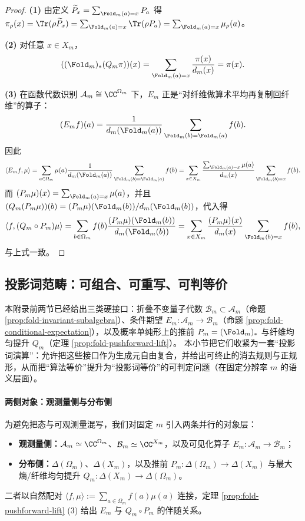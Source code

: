 \begin{proof}
\textbf{(1)} 由定义 \(\widetilde P_x=\sum_{\Fold_m(a)=x}P_a\) 得
\(
\pi_\rho(x)=\Tr(\rho\widetilde P_x)=\sum_{\Fold_m(a)=x}\Tr(\rho P_a)=\sum_{\Fold_m(a)=x}\mu_\rho(a)
\)。

\textbf{(2)} 对任意 $x\in X_m$，
\[
((\Fold_m)_*(Q_m\pi))(x)=\sum_{\Fold_m(a)=x}\frac{\pi(x)}{d_m(x)}=\pi(x).
\]

\textbf{(3)} 在函数代数识别 $\mathcal{A}_m\cong \CC^{\Omega_m}$ 下，$E_m$ 正是“对纤维做算术平均再复制回纤维”的算子：
\[
(E_m f)(a)=\frac{1}{d_m(\Fold_m(a))}\sum_{\Fold_m(b)=\Fold_m(a)} f(b).
\]
因此
\[
\langle E_m f,\mu\rangle
=\sum_{a\in\Omega_m}\mu(a)\frac{1}{d_m(\Fold_m(a))}\sum_{\Fold_m(b)=\Fold_m(a)} f(b)
=\sum_{x\in X_m}\frac{\sum_{\Fold_m(a)=x}\mu(a)}{d_m(x)}\sum_{\Fold_m(b)=x}f(b).
\]
而 $(P_m\mu)(x)=\sum_{\Fold_m(a)=x}\mu(a)$，并且 $(Q_m(P_m\mu))(b)=(P_m\mu)(\Fold_m(b))/d_m(\Fold_m(b))$，代入得
\[
\langle f,(Q_m\circ P_m)\mu\rangle
=\sum_{b\in\Omega_m} f(b)\frac{(P_m\mu)(\Fold_m(b))}{d_m(\Fold_m(b))}
=\sum_{x\in X_m}\frac{(P_m\mu)(x)}{d_m(x)}\sum_{\Fold_m(b)=x}f(b),
\]
与上式一致。
\end{proof}

\subsection{投影词范畴：可组合、可重写、可判等价}\label{app:op-algebra-projection-word}
本附录前两节已经给出三类硬接口：折叠不变量子代数 \(\mathcal{B}_m\subset\mathcal{A}_m\)（命题 \ref{prop:fold-invariant-subalgebra}）、条件期望 \(E_m:\mathcal{A}_m\to\mathcal{B}_m\)（命题 \ref{prop:fold-conditional-expectation}），以及概率单纯形上的推前 \(P_m=(\Fold_m)_*\) 与纤维均匀提升 \(Q_m\)（定理 \ref{prop:fold-pushforward-lift}）。
本小节把它们收紧为一套“投影词演算”：允许把这些接口作为生成元自由复合，并给出可终止的消去规则与正规形，从而把“算法等价”提升为“投影词等价”的可判定问题（在固定分辨率 \(m\) 的语义层面）。

\paragraph{两侧对象：观测量侧与分布侧}
为避免把态与可观测量混写，我们对固定 \(m\) 引入两条并行的对象层：
\begin{itemize}
  \item \textbf{观测量侧：}\(\mathcal{A}_m\simeq \CC^{\Omega_m}\)、\(\mathcal{B}_m\simeq \CC^{X_m}\)，以及可见化算子 \(E_m:\mathcal{A}_m\to\mathcal{B}_m\)；
  \item \textbf{分布侧：}\(\Delta(\Omega_m)\)、\(\Delta(X_m)\)，以及推前 \(P_m:\Delta(\Omega_m)\to\Delta(X_m)\) 与最大熵/纤维均匀提升 \(Q_m:\Delta(X_m)\to\Delta(\Omega_m)\)。
\end{itemize}
二者以自然配对
\(
\langle f,\mu\rangle:=\sum_{a\in\Omega_m} f(a)\mu(a)
\)
连接，定理 \ref{prop:fold-pushforward-lift} (3) 给出 \(E_m\) 与 \(Q_m\circ P_m\) 的伴随关系。

